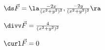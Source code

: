 {$\ds\vec F = \la \frac{-2x}{(x^2+y^2)^2},\frac{-2y}{(x^2+y^2)^2}\ra$
}
{$\divv \vec F = \frac{4}{(x^2+y^2)^2}$

$\curl \vec F = 0$}
